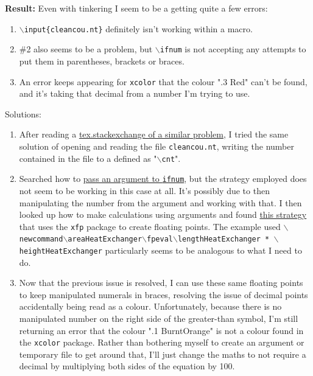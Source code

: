 \documentclass[12pt]{article}
\begin{document}
\textbf{Result:} Even with tinkering I seem to be a getting quite a few errors: 
\begin{enumerate}
    \item \texttt{$\backslash$input\{cleancou.nt\}} definitely isn't working within a macro. 
    \item \#2 also seems to be a problem, but \texttt{$\backslash$ifnum} is not accepting any attempts to put them in parentheses, brackets or braces.
    \item An error keeps appearing for \texttt{xcolor} that the colour ".3 Red" can't be found, and it's taking that decimal from a number I'm trying to use.
\end{enumerate}
Solutions:
\begin{enumerate}
    \item After reading a \href{https://tex.stackexchange.com/questions/204029/read-number-from-file}{tex.stackexchange of a similar problem}, I tried the same solution of opening and reading the file \texttt{cleancou.nt}, writing the number contained in the file to a defined as "\texttt{$\backslash$cnt}".
    \item Searched how to \href{https://tex.stackexchange.com/questions/67362/passing-argument-to-ifnum}{pass an argument to \texttt{ifnum}}, but the strategy employed does not seem to be working in this case at all. It's possibly due to then manipulating the number from the argument and working with that. I then looked up how to make calculations using arguments and found \href{https://tex.stackexchange.com/questions/453454/calculations-on-variables-using-latex}{this strategy} that uses the \texttt{xfp} package to create floating points. The example used \texttt{$\backslash$newcommand{$\backslash$areaHeatExchanger}{$\backslash$fpeval{$\backslash$lengthHeatExchanger * $\backslash$heightHeatExchanger}}} particularly seems to be analogous to what I need to do.
    \item Now that the previous issue is resolved, I can use these same floating points to keep manipulated numerals in braces, resolving the issue of decimal points accidentally being read as a colour. Unfortunately, because there is no manipulated number on the right side of the greater-than symbol, I'm still returning an error that the colour ".1 BurntOrange" is not a colour found in the \texttt{xcolor} package. Rather than bothering myself to create an argument or temporary file to get around that, I'll just change the maths to not require a decimal by multiplying both sides of the equation by 100.
\end{enumerate}
\end{document}
